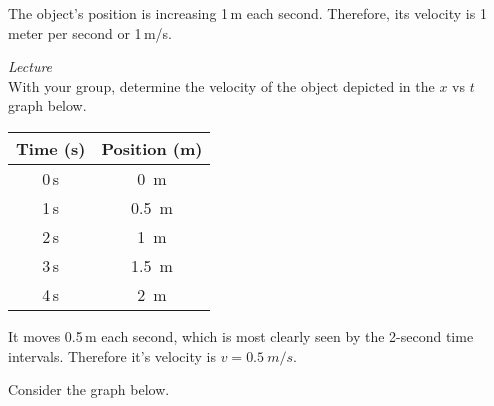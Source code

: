 \documentclass[dvipsnames]{exam}
\begin{document}
\begin{questions}
\begin{solution}
    The object's position is increasing 1\,m each second. Therefore, its velocity is 1 meter per second or 1\,m/s.
\end{solution}

\question
\textit{Lecture}\\
With your group, determine the velocity of the object depicted in the $x$ vs $t$ graph below.

\begin{center}
\end{center}

\begin{solution}
    \begin{center}
        \begin{tabular}{|c|c|}
            \hline
             \textbf{Time (s)} & \textbf{Position (m)} \\ \hline
             0\,s & \SI{0}{m} \\ \hline
             1\,s & \SI{0.5}{m} \\ \hline
             2\,s & \SI{1}{m} \\ \hline
             3\,s & \SI{1.5}{m} \\  \hline
             4\,s & \SI{2}{m} \\ \hline
        \end{tabular}
    \end{center}

    It moves 0.5\,m each second, which is most clearly seen by the 2-second time intervals. Therefore it's velocity is $v = \SI{0.5}{m/s}$.
\end{solution}

\question \label{K10V9}
Consider the graph below.

\begin{center}
\end{center}


\end{questions}
\end{document}

